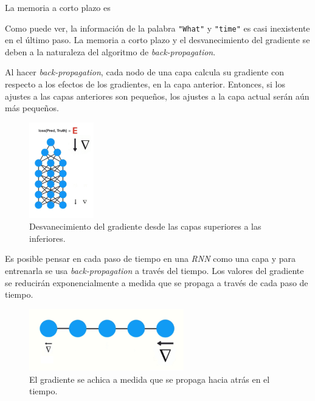 \documentclass[a4paper,12pt]{article}
\begin{document}
La memoria a corto plazo es 

Como puede ver, la información de la palabra \texttt{"What"} y \texttt{"time"} es casi inexistente en el último paso. La memoria a corto plazo y el desvanecimiento del gradiente se deben a la naturaleza del algoritmo de \textit{back-propagation}.

Al hacer \textit{back-propagation}, cada nodo de una capa calcula su gradiente con respecto a los efectos de los gradientes, en la capa anterior. Entonces, si los ajustes a las capas anteriores son pequeños, los ajustes a la capa actual serán aún más pequeños. 

\begin{figure}[H]
	\begin{center}				
	\includegraphics[width=0.25\textwidth]{vanishing4.png}
  	\caption{Desvanecimiento del gradiente desde las capas superiores a las inferiores.}
  	\label{fig:rnnvanishing4}
  	\end{center}
\end{figure}

Es posible pensar en cada paso de tiempo en una \textit{RNN} como una capa y para entrenarla se usa \textit{back-propagation} a través del tiempo. Los valores del gradiente se reducirán exponencialmente a medida que se propaga a través de cada paso de tiempo.

\begin{figure}[H]
	\begin{center}				
	\includegraphics[width=0.6\textwidth]{vanishing5.png}
  	\caption{El gradiente se achica a medida que se propaga hacia atrás en el tiempo.}
  	\label{fig:rnnvanishing5}
  	\end{center}
\end{figure}
\end{document}

